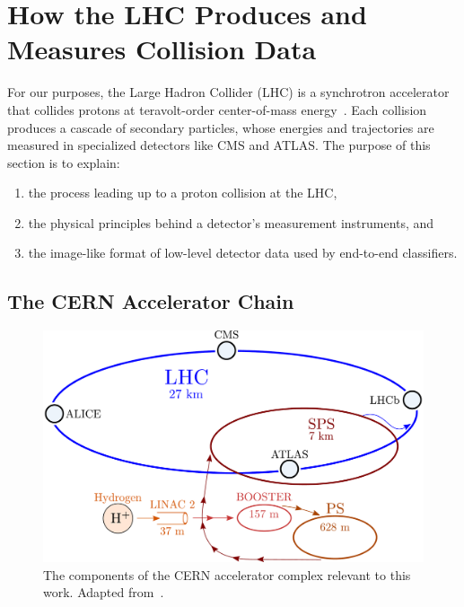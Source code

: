 \documentclass[11pt, a4paper]{article}
\begin{document}
\section{How the LHC Produces and Measures Collision Data}
For our purposes, the Large Hadron Collider (LHC) is a synchrotron accelerator that collides protons at teravolt-order center-of-mass energy~\cite{lhc}.
Each collision produces a cascade of secondary particles, whose energies and trajectories are measured in specialized detectors like CMS and ATLAS.
The purpose of this section is to explain:
\begin{enumerate}

    \item the process leading up to a proton collision at the LHC,

    \item the physical principles behind a detector's measurement instruments, and

    \item the image-like format of low-level detector data used by end-to-end classifiers. %


\end{enumerate}

\subsection{The CERN Accelerator Chain}

\begin{figure}[htb!]
    \centering
    \includegraphics[width=0.75\linewidth]{vector/cern-complex.pdf}
    \caption{The components of the CERN accelerator complex relevant to this work.
    Adapted from~\cite{image-cern-complex}.}
    \label{fig:cern-complex}
\end{figure}
\end{document}
